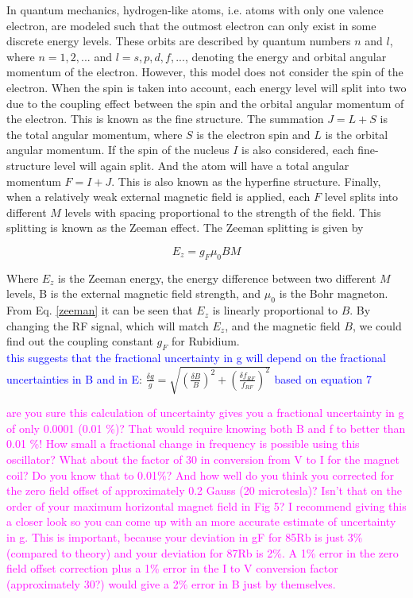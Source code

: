 \documentclass[prb,preprint]{revtex4-1}
\begin{document}
In quantum mechanics, hydrogen-like atoms, i.e. atoms with only one valence electron, are modeled such that the outmost electron can only exist in some discrete energy levels. These orbits are described by quantum numbers $n$ and $l$, where $n=1, 2, ...$ and $l=s, p, d, f, ...$, denoting the energy and orbital angular momentum of the electron. However, this model does not consider the spin of the electron. When the spin is taken into account, each energy level will split into two due to the coupling effect between the spin and the orbital angular momentum of the electron. This is known as the fine structure. The summation $J=L+S$ is the total angular momentum, where $S$ is the electron spin and $L$ is the orbital angular momentum. If the spin of the nucleus $I$ is also considered, each fine-structure level will again split. And the atom will have a total angular momentum $F=I+J$. This is also known as the hyperfine structure. Finally, when a relatively weak external magnetic field is applied, each $F$ level splits into different $M$ levels with spacing proportional to the strength of the field. This splitting is known as the Zeeman effect. The Zeeman splitting is given by

\begin{equation}
E_{z}=g_{F} \mu_{0} BM
\label{zeeman}
\end{equation}

Where $E_{z}$ is the Zeeman energy, the energy difference between two different $M$ levels, B is the external magnetic field strength, and $\mu_{0}$ is the Bohr magneton. From Eq. \eqref{zeeman} it can be seen that $E_{z}$ is linearly proportional to $B$. By changing the RF signal, which will match $E_{z}$, and the magnetic field $B$, we could find out the coupling constant $g_{F}$ for Rubidium.\\

\textcolor{blue}{this suggests that the fractional uncertainty in g will depend on the fractional uncertainties in B and in E}: $ \frac{\delta g}{g} = \sqrt{{\left( \frac{\delta B}{B}\right)}^2 + {\left( \frac{\delta f_{RF}}{f_{RF}}\right)}^2}$ \textcolor{blue}{based on equation 7}

\textcolor{magenta}{are you sure this calculation of uncertainty gives you a fractional uncertainty in g of only 0.0001 (0.01 \%)? That would require knowing both B and f to better than 0.01 \%! How small a fractional change in frequency is possible using this oscillator? What about the factor of 30 in conversion from V to I for the magnet coil? Do you know that to 0.01\%?  And how well do you think you corrected for the zero field offset of approximately 0.2 Gauss (20 microtesla)? Isn't that on the order of your maximum horizontal magnet field in Fig 5? I recommend giving this a closer look so you can come  up with an more accurate estimate of uncertainty in g. This is important, because your deviation in gF for 85Rb is just 3\% (compared to theory) and your deviation for 87Rb is 2\%. A 1\% error in the zero field offset correction plus a 1\% error in the I to V conversion factor (approximately 30?) would give a 2\% error in B just by themselves. } 
\end{document}
